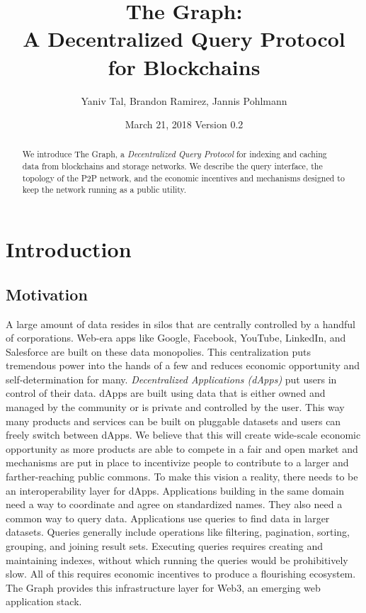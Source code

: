 \documentclass[12pt]{article}
\title{The Graph: \protect\\ A Decentralized Query Protocol for Blockchains}
\author{Yaniv Tal, Brandon Ramirez, Jannis Pohlmann}
\date{March 21, 2018
\endgraf\bigskip Version 0.2}
\begin{document}
\maketitle
\begin{abstract}
We introduce The Graph, a \textit{Decentralized Query Protocol} for indexing and caching data from blockchains and storage networks. We describe the query interface, the topology of the P2P network, and the economic incentives and mechanisms designed to keep the network running as a public utility.
\end{abstract}
\section{Introduction}
\subsection{Motivation}
A large amount of data resides in silos that are centrally controlled by a handful of corporations. Web-era apps like Google, Facebook, YouTube, LinkedIn, and Salesforce are built on these data monopolies. This centralization puts tremendous power into the hands of a few and reduces economic opportunity and self-determination for many.
\newline
\newline
\textit{Decentralized Applications (dApps)} put users in control of their data. dApps are built using data that is either owned and managed by the community or is private and controlled by the user. This way many products and services can be built on pluggable datasets and users can freely switch between dApps. We believe that this will create wide-scale economic opportunity as more products are able to compete in a fair and open market and mechanisms are put in place to incentivize people to contribute to a larger and farther-reaching public commons.
\newline
\newline
To make this vision a reality, there needs to be an interoperability layer for dApps. Applications building in the same domain need a way to coordinate and agree on standardized names. They also need a common way to query data. Applications use queries to find data in larger datasets. Queries generally include operations like filtering, pagination, sorting, grouping, and joining result sets. Executing queries requires creating and maintaining indexes, without which running the queries would be prohibitively slow. All of this requires economic incentives to produce a flourishing ecosystem. The Graph provides this infrastructure layer for Web3, an emerging web application stack.
\end{document}
